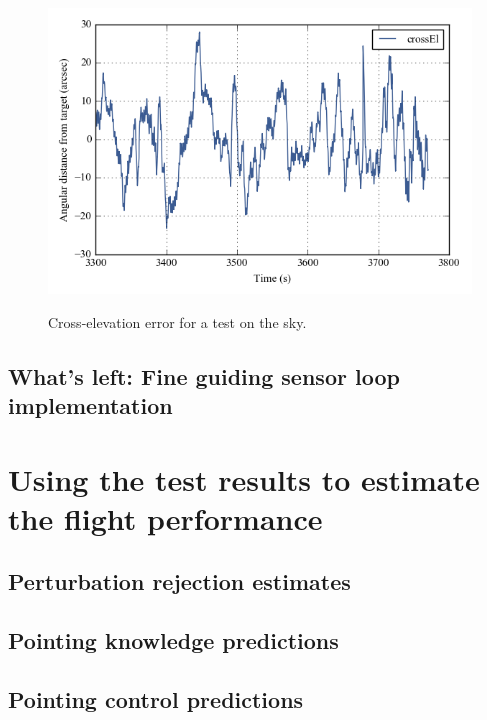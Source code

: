 \begin{figure}[!h]
\begin{center}
\includegraphics{Figures/crossEl_outside.png}
\label{fig:crossEl_outside}
\vspace{-0.5cm}
\caption[Cross-elevation error]{Cross-elevation error for a test on the sky.}
\end{center}
\end{figure}



\subsection{What's left: Fine guiding sensor loop implementation}

\section{	Using the test results to estimate the flight performance}
\subsection{Perturbation rejection estimates}
\subsection{Pointing knowledge predictions}
\subsection{Pointing control predictions}
